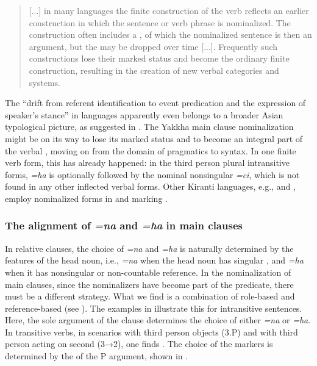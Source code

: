 \begin{quote} 
[...] in many  languages the finite construction of the verb reflects an earlier construction in which the sentence or verb phrase is nominalized. The construction  often  includes  a  ,  of  which  the  nominalized  sentence  is  then  an argument, but the  may be dropped over time [...]. Frequently  such  constructions  lose  their marked  status  and  become  the  ordinary  finite  construction,  resulting  in  the creation  of  new  verbal  categories  and  systems. \citep[343]{DeLancey2011_Finite}
\end{quote}
 
The “drift from referent identification to event predication and the expression of speaker’s stance” in  languages apparently even belongs to a broader Asian typological picture, as suggested in \citet{Yapetal2010_Non-referential}. The Yakkha main clause nominalization might be on its way to lose its marked status and to become an integral part of the verbal , moving on from the domain of pragmatics to syntax. In one finite verb form, this has already happened: in the third person plural intransitive forms, \emph{=ha} is optionally followed by the nominal nonsingular  \emph{=ci}, which is not found in any other inflected verbal forms. Other Kiranti languages, e.g.,  and , employ nominalized forms in  and  marking \citep{Driem1993Einige, Doornenbal2008_Nominalization}. 



\subsubsection{The alignment of \emph{=na} and \emph{=ha} in main clauses}

In relative clauses, the choice of  \emph{=na} and \emph{=ha} is naturally determined by the  features of the head noun, i.e., \emph{=na} when the head noun has singular , and \emph{=ha} when it has nonsingular or non-countable reference. In the nominalization of main clauses, since the nominalizers have become part of the predicate, there must be a different strategy.  What we find is a combination of role-based and reference-based  (see ). The examples in  \Next illustrate this for intransitive sentences. Here, the sole argument of the clause determines the choice of either  \emph{=na} or \emph{=ha}. In transitive verbs, in scenarios with third person objects (3.P) and with third person acting on second  (3→2), one finds  . The choice of the markers is determined by the  of the P argument, shown in  \NNext. 


